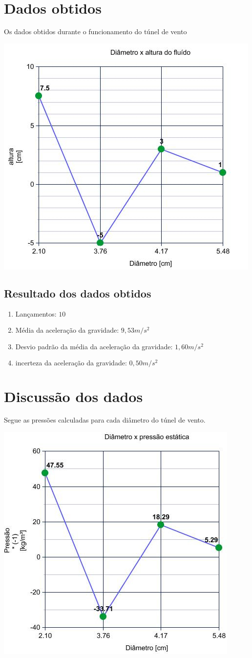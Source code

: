 \documentclass[a4paper]{article}
\begin{document}
\section{Dados obtidos}
    Os dados obtidos durante o funcionamento do túnel de vento
    \begin{center}
          \includegraphics[width=.6\linewidth]{img/height.jpg}
          \label{graph}
    \end{center}


\subsection{Resultado dos dados obtidos}
\begin{enumerate}
    \item Lançamentos: $ 10 $
    \item Média da aceleração da gravidade: $ 9,53 m/s^2 $
    \item Desvio padrão da média da aceleração da gravidade: $ 1,60 m/s^2 $
    \item incerteza da aceleração da gravidade: $ 0,50 m/s^2 $
\end{enumerate}

\section{Discussão dos dados}
    Segue as pressões calculadas para cada diâmetro do túnel de vento.
        \begin{center}
              \includegraphics[width=.6\linewidth]{img/graph.jpg}
              \label{graph}
        \end{center}
\end{document}

